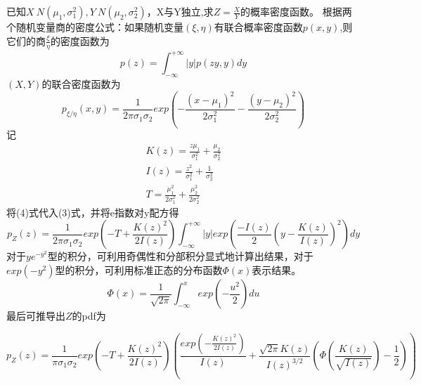 ﻿\documentclass[12pt]{article}
\begin{document}
\section{\textbf{}}
已知$X~N(\mu_1,\sigma_1^2),Y~N(\mu_2,\sigma_2^2)$，X与Y独立,求$Z=\frac{X}{Y}$的概率密度函数。
根据两个随机变量商的密度公式：如果随机变量$(\xi,\eta)$有联合概率密度函数$p(x,y)$,则它们的商$\frac{\xi}{\eta}$的密度函数为
\begin{equation}
p(z)=\int_{-\infty}^{+\infty}|y|p(zy,y)dy
\end{equation}
$(X,Y)$的联合密度函数为
\begin{equation}
p_{\xi/\eta}(x,y)=\frac{1}{2\pi \sigma_1 \sigma_2}exp(-\frac{(x-\mu_1)^2}{2\sigma_1^2}-\frac{(y-\mu_2)^2}{2\sigma_2^2})
\end{equation}
记
\begin{eqnarray}
K(z)=\frac{z\mu_1}{\sigma_1^2}+\frac{\mu_2}{\sigma_2^2}\\
I(z)=\frac{z^2}{\sigma_1^2}+\frac{1}{\sigma_2^2}\\
T=\frac{\mu_1^2}{2\sigma_1^2}+\frac{\mu_2^2}{2\sigma_2^2}
\end{eqnarray}
将(4)式代入(3)式，并将e指数对y配方得
\begin{equation}
p_Z(z)=\frac{1}{2\pi \sigma_1\sigma_2}exp(-T+\frac{K(z)^2}{2I(z)})\int_{-\infty}^{+\infty}|y|exp(\frac{-I(z)}{2}(y-\frac{K(z)}{I(z)})^2)dy
\end{equation}
对于$ye^{-y^2}$型的积分，可利用奇偶性和分部积分显式地计算出结果，对于$exp(-y^2)$型的积分，可利用标准正态的分布函数$\Phi (x)$表示结果。
\begin{equation}
\Phi (x)=\frac{1}{\sqrt{2\pi}}\int_{-\infty}^{x}exp(-\frac{u^2}{2})du
\end{equation}
最后可推导出$Z$的pdf为

\begin{equation}
p_Z(z)=\frac{1}{\pi \sigma_1\sigma_2}exp(-T+\frac{K(z)^2}{2I(z)})(\frac{exp(-\frac{K(z)^2}{2I(z)})}{I(z)}+\frac{\sqrt{2\pi}K(z)}{I(z)^{3/2}}(\Phi(\frac{K(z)}{\sqrt{I(z)}})-\frac{1}{2}))
\end{equation}
\end{document}
